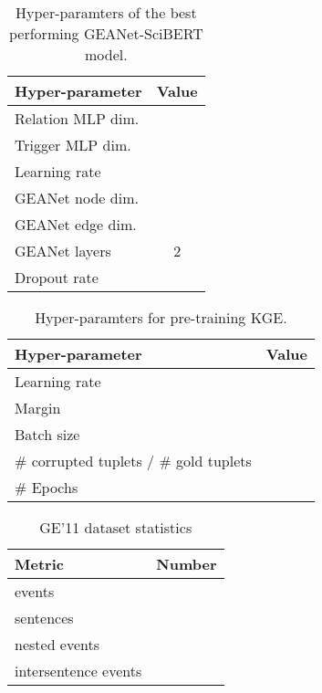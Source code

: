 \documentclass[11pt,a4paper]{article}
\newcommand{\GAENet}{\textrm{GEANet}}
\newcommand{\GE}{\textrm{{\fontfamily{qcr}\selectfont GE'11} }}
\begin{document}
\begin{table}[t]
\small
\centering
\begin{tabular}{lc}
\hline 
\textbf{Hyper-parameter}  & \textbf{Value} \\ \hline
Relation MLP dim. &  \\
Trigger MLP dim. &  \\
Learning rate &   \\
\GAENet{} node dim. &  \\
\GAENet{} edge dim. &  \\
\GAENet{} layers & 2 \\
Dropout rate &  \\

\hline
\end{tabular}
\caption{\label{font-table} Hyper-paramters of the best performing \GAENet-SciBERT model.}
\label{table:hyperparameter_best}
\end{table}

\begin{table}[t]
\small
\centering
\begin{tabular}{lc}
\hline 
\textbf{Hyper-parameter}  & \textbf{Value} \\ \hline

Learning rate &   \\
Margin & \\
Batch size &  \\
\# corrupted tuplets / \# gold tuplets & \\
\# Epochs &  \\


\hline
\end{tabular}
\caption{\label{font-table} Hyper-paramters for pre-training KGE.}
\label{table:kge_hyper_parameter}
\end{table}

\begin{table}
\small
\centering
\begin{tabular}{lc}
\hline 
\textbf{Metric} & \textbf{Number} \\ \hline
events &  \\
sentences &  \\
nested events &   \\
intersentence events &  \\


\hline
\end{tabular}
\caption{\label{font-table} \GE dataset statistics}
\label{table:ge11_stats}
\end{table} 
\end{document}
